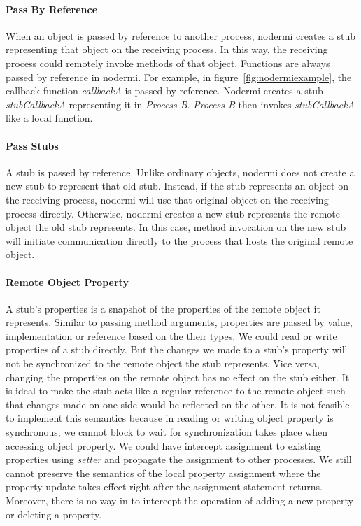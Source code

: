 \paragraph{Pass By Reference}
When an object is passed by reference to another process,
nodermi creates a stub representing that object on the receiving process.
In this way,
the receiving process could remotely invoke methods of that object.
Functions are always passed by reference in nodermi.
For example, in figure~\ref{fig:nodermiexample}, the callback function
\emph{callbackA} is passed by reference. Nodermi creates
a stub \emph{stubCallbackA} representing it in \emph{Process B}.
\emph{Process B} then invokes \emph{stubCallbackA} like a local function.

\paragraph{Pass Stubs}
A stub is passed by reference. Unlike ordinary objects,
nodermi does not create a new stub to represent that old
stub.
Instead, if the stub represents an object on the receiving
process, nodermi will use that original object on the receiving
process directly.
Otherwise, nodermi creates a new stub represents
the remote object the old stub represents.
In this case, method invocation on the new stub will
initiate communication directly to the process that
hosts the original remote object.



\paragraph{Remote Object Property}
A stub's properties is a snapshot of the properties
of the remote object it represents.
Similar to passing method arguments,
properties are passed by value, implementation or reference
based on the their types.
We could read or write properties of a stub directly.
But the changes we made to a stub's property
will not be synchronized to the remote object the stub represents.
Vice versa,
changing the properties on the remote object has no effect
on the stub either.
It is ideal to make the stub acts like a regular reference
to the remote object such that
changes made on one side would be reflected on the other.
It is not feasible to implement this semantics because
in \js{} reading or writing object property is synchronous,
we cannot block to wait for synchronization takes place
 when accessing object property.
We could have intercept assignment to existing properties using
\emph{setter} and propagate the assignment to other processes.
We still cannot preserve the semantics of the local property assignment
where the property update takes effect right after the assignment statement returns.
Moreover, there is no way in \js{} to intercept the operation of
adding a new property or deleting a property.



